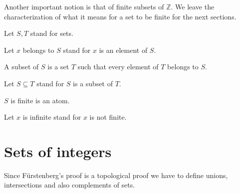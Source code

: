 \documentclass{article}
\newcommand{\Int}{\mathbb{Z}}
\begin{document}
  Another important notion is that of finite subsets of $\Int$. We leave the characterization of what it means for a set to be finite for the next sections.

  \begin{forthel}

    Let $S,T$ stand for sets.

    Let $x$ belongs to $S$ stand for $x$ is an element of $S$.

    \begin{definition}[Subset]
      A subset of $S$ is a set $T$ such that every element of $T$ belongs to $S$.
    \end{definition}

    Let $S \subseteq T$ stand for $S$ is a subset of $T$.

    \begin{signature}[FinSet]
      $S$ is finite is an atom.
    \end{signature}

    Let $x$ is infinite stand for $x$ is not finite.
  \end{forthel}


  \section{Sets of integers}

  Since Fürstenberg's proof is a topological proof we have to define unions, intersections and also complements of sets.
\end{document}
